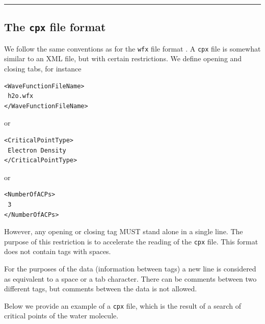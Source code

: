 \rule{\textwidth}{1pt}


\subsection{\label{sec:cpxfilefmt}The \texttt{cpx} file format}

We follow the same conventions as for the \texttt{wfx} file format \cite{bib:webwfxformat}. A \texttt{cpx} file is somewhat similar to an XML file, but with certain restrictions. We define opening and closing tabs, for instance
%
\begin{verbatim}
<WaveFunctionFileName>
 h2o.wfx
</WaveFunctionFileName>
\end{verbatim}
or
\begin{verbatim}
<CriticalPointType>
 Electron Density
</CriticalPointType>
\end{verbatim}
or
\begin{verbatim}
<NumberOfACPs>
 3
</NumberOfACPs>
\end{verbatim}

However, any opening or closing tag MUST stand alone in a single line. The purpose of this restriction is to accelerate the reading of the \texttt{cpx} file. This format does not contain tags with spaces.

For the purposes of the data (information between tags) a new line is considered as equivalent to a space or a tab character. There can be comments between two different tags, but comments between the data is not allowed.

Below we provide an example of a \texttt{cpx} file, which is the result of a search of critical points of the water molecule.

